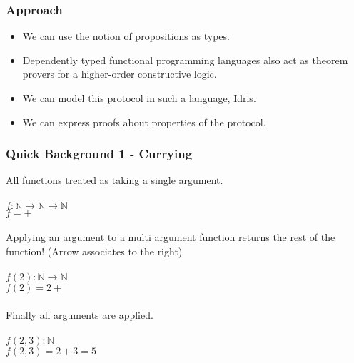 \documentclass{beamer}
\begin{document}
\begin{frame}[fragile]
  \frametitle{Approach}
  \begin{itemize}
    \item We can use the notion of propositions as types.
    \item Dependently typed functional programming languages
            also act as theorem provers for a higher-order
                  constructive logic.
    \item We can model this protocol in such a language, Idris.
    \item We can express proofs about properties of the protocol.
  \end{itemize}
\end{frame}

\begin{frame}[fragile]
  \frametitle{Quick Background 1 - Currying}
  All functions treated as taking a single argument. \\ \\
  $f : \mathbb{N} \rightarrow \mathbb{N} \rightarrow \mathbb{N}$ \\
  $f = + $ \\ \\
  Applying an argument to a multi argument function returns the 
    rest of the function! (Arrow associates to the right)\\ \\
  $f(2) : \mathbb{N} \rightarrow \mathbb{N}$ \\
  $f(2) = 2 + $ \\ \\
  Finally all arguments are applied. \\ \\
  $f(2, 3) : \mathbb{N}$ \\
  $f(2, 3) = 2 + 3 = 5 $
\end{frame}
\end{document}
